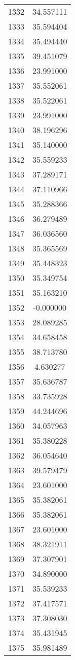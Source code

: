 \documentclass[12pt]{article}
\begin{document}
\begin{longtable}{@{}cc@{}}
1332 & 34.557111 \\
1333 & 35.594404 \\
1334 & 35.494440 \\
1335 & 39.451079 \\
1336 & 23.991000 \\
1337 & 35.552061 \\
1338 & 35.522061 \\
1339 & 23.991000 \\
1340 & 38.196296 \\
1341 & 35.140000 \\
1342 & 35.559233 \\
1343 & 37.289171 \\
1344 & 37.110966 \\
1345 & 35.288366 \\
1346 & 36.279489 \\
1347 & 36.036560 \\
1348 & 35.365569 \\
1349 & 35.448323 \\
1350 & 35.349754 \\
1351 & 35.163210 \\
1352 & -0.000000 \\
1353 & 28.089285 \\
1354 & 34.658458 \\
1355 & 38.713780 \\
1356 & 4.630277 \\
1357 & 35.636787 \\
1358 & 33.735928 \\
1359 & 44.244696 \\
1360 & 34.057963 \\
1361 & 35.380228 \\
1362 & 36.054640 \\
1363 & 39.579479 \\
1364 & 23.601000 \\
1365 & 35.382061 \\
1366 & 35.382061 \\
1367 & 23.601000 \\
1368 & 38.321911 \\
1369 & 37.307901 \\
1370 & 34.890000 \\
1371 & 35.539233 \\
1372 & 37.417571 \\
1373 & 37.308030 \\
1374 & 35.431945 \\
1375 & 35.981489 \\

\end{longtable}
\end{document}
